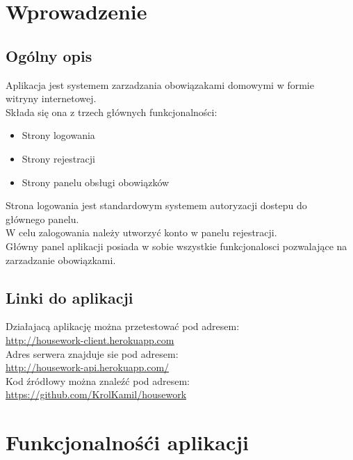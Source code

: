 \documentclass[12pt,a4paper]{article}  %
\begin{document}
	\newpage
	\thispagestyle{empty}
	\tableofcontents
	\newpage
	
	\section{Wprowadzenie}
	\setcounter{page}{1}
		\subsection{Ogólny opis}
		Aplikacja jest systemem zarzadzania obowiązakami domowymi w formie\\ witryny internetowej. \\[0.5cm]
		Składa się ona z trzech głównych funkcjonalności:
		\begin{itemize}
			\item Strony logowania
			\item Strony rejestracji
			\item Strony panelu obsługi obowiązków
		\end{itemize}
		Strona logowania jest standardowym systemem autoryzacji dostepu do \\ głównego panelu. \\
		W celu zalogowania należy utworzyć konto w panelu rejestracji. \\
		Główny panel aplikacji posiada w sobie wszystkie funkcjonalosci pozwalające na zarzadzanie obowiązkami.\\
		\subsection{Linki do aplikacji}
		Działajacą aplikację można przetestować pod adresem: \\ \textcolor{blue}{\url{http://housework-client.herokuapp.com}} \\ [1.0cm]
		Adres serwera znajduje sie pod adresem: \\
		\textcolor{blue}{\url{http://housework-api.herokuapp.com/}} \\ [1.0cm]
		Kod źródłowy można znaleźć pod adresem: \\
		\textcolor{blue}{\url{https://github.com/KrolKamil/housework}} \\ [1.0cm]
	\newpage
	\section{Funkcjonalnośći aplikacji}
\end{document}
